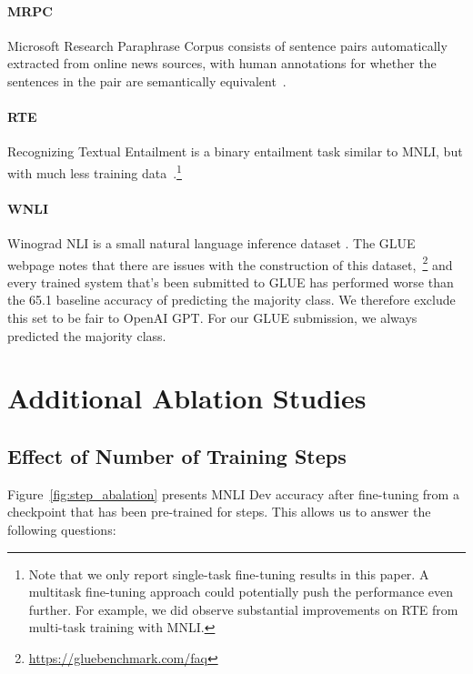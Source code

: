 \documentclass[11pt,a4paper]{article}
\begin{document}
\paragraph{MRPC} Microsoft Research Paraphrase Corpus consists of sentence pairs automatically extracted from online news sources, with human annotations for whether the sentences in the pair are semantically equivalent~\cite{dolan-brockett:2005:_autom}.

\paragraph{RTE} Recognizing Textual Entailment is a binary entailment task similar to MNLI, but with much less training data~\cite{bentivogli-etal:2009}.\footnote{Note that we only report single-task fine-tuning results in this paper. A multitask fine-tuning approach could potentially push
the performance even further. For example, we did observe substantial improvements on RTE from multi-task training with MNLI.}

\paragraph{WNLI} Winograd NLI is a small natural language inference dataset \cite{levesque-davis-morgenstern:2011:_winog}. The GLUE webpage notes that there are issues with the construction of this dataset,~\footnote{\url{https://gluebenchmark.com/faq}} and every trained system that's been submitted to GLUE has performed worse than the 65.1 baseline accuracy of predicting the majority class. We therefore exclude this set to be fair to OpenAI GPT. For our GLUE submission, we always predicted the majority class.



 

\section{Additional Ablation Studies}
\label{appendix:sec:more_ablation_studies}

\subsection{Effect of Number of Training Steps}
\label{sec:num_training_steps}

Figure~\ref{fig:step_abalation} presents MNLI Dev accuracy after fine-tuning from a checkpoint that has been pre-trained for  steps. This allows us to answer the following questions:
\end{document}
